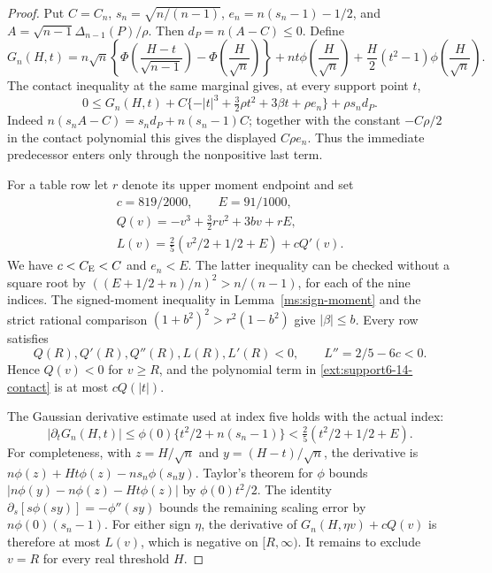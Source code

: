 \begin{proof}
Put $C=C_n$, $s_n=\sqrt{n/(n-1)}$,
$e_n=n(s_n-1)-1/2$, and
$A=\sqrt{n-1}\Delta_{n-1}(P)/\rho$.
Then $d_P=n(A-C)\le0$. Define
\[
 G_n(H,t)=n\sqrt n\left\{
 \Phi\left(\frac{H-t}{\sqrt{n-1}}\right)
 -\Phi\left(\frac H{\sqrt n}\right)\right\}
 +nt\phi\left(\frac H{\sqrt n}\right)
 +\frac H2(t^2-1)\phi\left(\frac H{\sqrt n}\right).
\]
The contact inequality at the same marginal gives, at every support
point $t$,
\begin{equation}\label{ext:support6-14-contact}
 0\le G_n(H,t)
 +C\{-|t|^3+\tfrac32\rho t^2+3\beta t+\rho e_n\}
 +\rho s_n d_P.
\end{equation}
Indeed $n(s_nA-C)=s_nd_P+n(s_n-1)C$; together with
the constant $-C\rho/2$ in the contact polynomial this gives the
displayed $C\rho e_n$. Thus the immediate predecessor enters only
through the nonpositive last term.

For a table row let $r$ denote its upper moment endpoint and set
\[
 \begin{gathered}
 c=819/2000,\qquad E=91/1000,\\
 Q(v)=-v^3+\tfrac32rv^2+3bv+rE,\\
 L(v)=\tfrac25(v^2/2+1/2+E)+cQ'(v).
 \end{gathered}
\]
We have $c<C_{\mathrm E}<C$ and $e_n<E$. The latter inequality can be
checked without a square root by
$((E+1/2+n)/n)^2>n/(n-1)$, for each of the nine indices.
The signed-moment inequality in Lemma~\ref{ms:sign-moment} and the
strict rational comparison $(1+b^2)^2>r^2(1-b^2)$ give
$|\beta|\le b$.
Every row satisfies
\[
 Q(R),Q'(R),Q''(R),L(R),L'(R)<0,\qquad L''=2/5-6c<0.
\]
Hence $Q(v)<0$ for $v\ge R$, and the polynomial term in
\eqref{ext:support6-14-contact} is at most $cQ(|t|)$.

The Gaussian derivative estimate used at index five holds with the
actual index:
\begin{equation}\label{ext:support6-14-derivative}
 |\partial_tG_n(H,t)|
 \le\phi(0)\{t^2/2+n(s_n-1)\}
 <\tfrac25(t^2/2+1/2+E).
\end{equation}
For completeness, with $z=H/\sqrt n$ and $y=(H-t)/\sqrt n$,
the derivative is $n\phi(z)+Ht\phi(z)-ns_n\phi(s_ny)$.
Taylor's theorem for $\phi$ bounds
$|n\phi(y)-n\phi(z)-Ht\phi(z)|$ by $\phi(0)t^2/2$.
The identity $\partial_s[s\phi(sy)]=-\phi''(sy)$ bounds
the remaining scaling error by $n\phi(0)(s_n-1)$.
For either sign $\eta$, the derivative of
$G_n(H,\eta v)+cQ(v)$ is therefore at most $L(v)$, which is
negative on $[R,\infty)$. It remains to exclude $v=R$ for every
real threshold $H$.


\end{proof}
